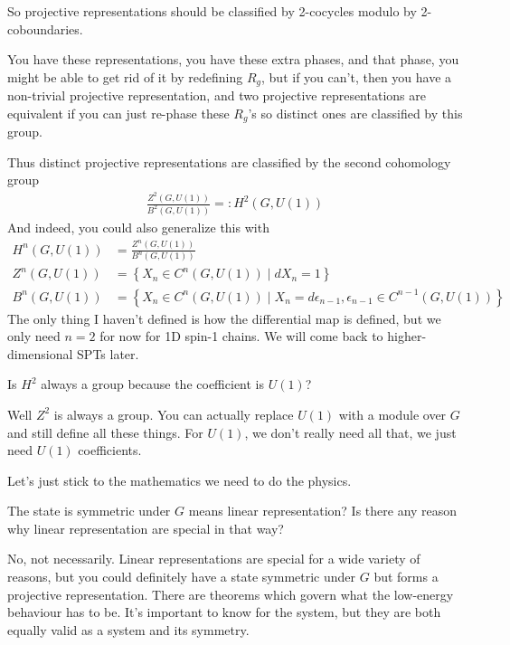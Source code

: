So projective representations should be classified by 2-cocycles modulo by
2-coboundaries.

You have these representations,
you have these extra phases,
and that phase,
you might be able to get rid of it by redefining $R_g$,
but if you can't,
then you have a non-trivial projective representation,
and two projective representations are equivalent if you can just re-phase these
$R_g$'s so distinct ones are classified by this group.

Thus distinct projective representations are classified by
the second cohomology group
\begin{align}
    \frac{Z^2(G, U(1))}{B^2(G, U(1))} =:
    H^2(G, U(1))
\end{align}
And indeed,
you could also generalize this with
\begin{align}
    H^n (G, U(1)) &=
    \frac{Z^n(G, U(1))}{B^n(G, U(1))}\\
    Z^n(G, U(1)) &=
    \left\{ X_n \in C^n(G, U(1)) \mid dX_n = 1 \right\}\\
    B^n\left( G, U(1) \right)
    &=
    \left\{ 
    X_n \in C^n(G, U(1)) \mid
    X_n = d\epsilon_{n-1},
    \epsilon_{n-1} \in C^{n-1}(G, U(1))
    \right\}
\end{align}
The only thing I haven't defined is how the differential map is defined,
but we only need $n=2$ for now for 1D spin-1 chains.
We will come back to higher-dimensional SPTs later.

\begin{question}
    Is $H^2$ always a group because the coefficient is $U(1)$?
\end{question}
Well $Z^2$ is always a group.
You can actually replace $U(1)$ with a module over $G$ and still define all
these things.
For $U(1)$,
we don't really need all that,
we just need $U(1)$ coefficients.

Let's just stick to the mathematics we need to do the physics.


\begin{question}
    The state is symmetric under $G$ means linear representation?
    Is there any reason why linear representation are special in that way?
\end{question}
No, not necessarily.
Linear representations are special for a wide variety of reasons,
but you could definitely have a state symmetric under $G$ but forms a projective
representation.
There are theorems which govern what the low-energy behaviour has to be.
It's important to know for the system,
but they are both equally valid as a system and its symmetry.


